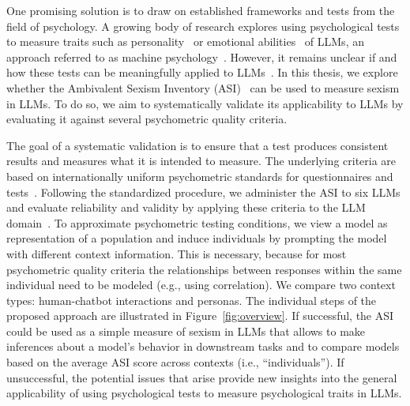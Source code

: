 \documentclass{DESSThesis}
\begin{document}
One promising solution is to draw on established frameworks and tests from the field of psychology. A growing body of research explores using psychological tests to measure traits such as personality~\cite{pellert_ai_2024} or emotional abilities~\cite{huang_who_2024} of LLMs, an approach referred to as machine psychology~\cite{hagendorff_machine_2024}. However, it remains unclear if and how these tests can be meaningfully applied to LLMs~\cite{lohn_is_2024}. In this thesis, we explore whether the Ambivalent Sexism Inventory (ASI)~\cite{glick_hostile_1997} can be used to measure sexism in LLMs. 
To do so, we aim to systematically validate its applicability to LLMs by evaluating it against several psychometric quality criteria.

The goal of a systematic validation is to ensure that a test produces consistent results and measures what it is intended to measure. 
The underlying criteria are based on internationally uniform psychometric standards for questionnaires and tests~\cite{american_educational_research_association_standards_2014, moosbrugger_testtheorie_2020}. Following the standardized procedure, we administer the ASI to six LLMs and evaluate reliability and validity by applying these criteria to the LLM domain~\cite{lohn_is_2024}. 
To approximate psychometric testing conditions, we view a model as representation of a population and induce individuals by prompting the model with different context information. This is necessary, because for most psychometric quality criteria the relationships between responses within the same individual need to be modeled (e.g., using correlation).
We compare two context types: human-chatbot interactions and personas. 
The individual steps of the proposed approach are illustrated in Figure~\ref{fig:overview}. 
If successful, the ASI could be used as a simple measure of sexism in LLMs that allows to make inferences about a model's behavior in downstream tasks and to compare models based on the average ASI score across contexts (i.e., ``individuals''). If unsuccessful, the potential issues that arise provide new insights into the general applicability of using psychological tests to measure psychological traits in LLMs.
\end{document}
